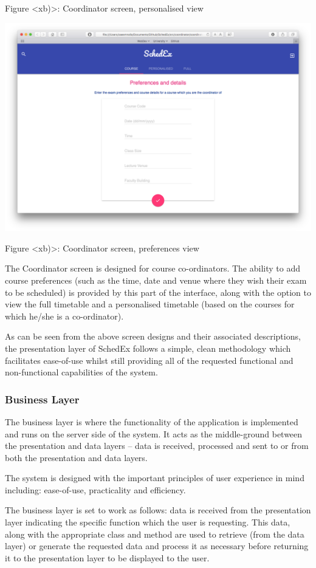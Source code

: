 \documentclass{article}
\begin{document}
Figure <xb)>: Coordinator screen, personalised view

\centerline{\includegraphics[scale=0.4]{coordinator_course}}

Figure <xb)>: Coordinator screen, preferences view

The Coordinator screen is designed for course co-ordinators. The ability to add course preferences (such as the time, date and venue where they wish their exam to be scheduled) is provided by this part of the interface, along with the option to view the full timetable and a personalised timetable (based on the courses for which he/she is a co-ordinator).

As can be seen from the above screen designs and their associated descriptions, the presentation layer of SchedEx follows a simple, clean methodology which facilitates ease-of-use whilst still providing all of the requested functional and non-functional capabilities of the system.

\subsubsection{Business Layer}
The business layer is where the functionality of the application is implemented and runs on the server side of the system. It acts as the middle-ground between the presentation and data layers – data is received, processed and sent to or from both the presentation and data layers.

The system is designed with the important principles of user experience in mind including: ease-of-use, practicality and efficiency.

The business layer is set to work as follows: data is received from the presentation layer indicating the specific function which the user is requesting. This data, along with the appropriate class and method are used to retrieve (from the data layer) or generate the requested data and process it as necessary before returning it to the presentation layer to be displayed to the user.
\end{document}
